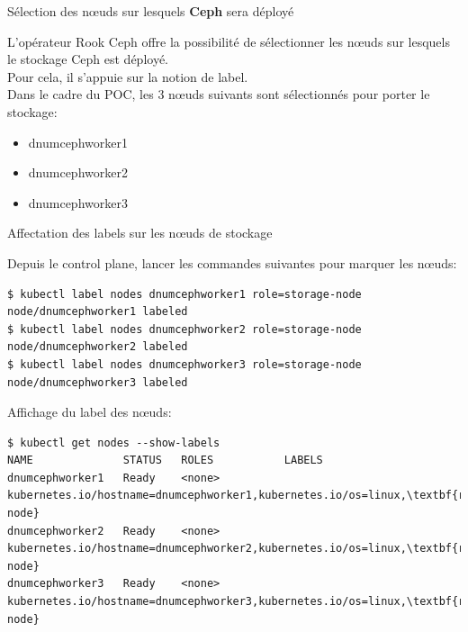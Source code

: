 
\begin{frame}[fragile]{Sélection des n\oe{}uds sur lesquels \textbf{Ceph} sera déployé}

   L'opérateur Rook Ceph offre la possibilité de sélectionner les n\oe{}uds sur lesquels le stockage Ceph est déployé.\\
   Pour cela, il s'appuie sur la notion de label.\\
   Dans le cadre du POC, les 3 n\oe{}uds suivants sont sélectionnés pour porter le stockage:
\begin{itemize}
   \item dnumcephworker1
   \item dnumcephworker2
   \item dnumcephworker3
\end{itemize}

\end{frame}


\begin{frame}[shrink=7,fragile]{Affectation des labels sur les n\oe{}uds de stockage}

   Depuis le control plane, lancer les commandes suivantes pour marquer les n\oe{}uds:
\begin{tiny}
\begin{Verbatim}[commandchars=\\\{\}]
$ kubectl label nodes dnumcephworker1 role=storage-node
node/dnumcephworker1 labeled
$ kubectl label nodes dnumcephworker2 role=storage-node
node/dnumcephworker2 labeled
$ kubectl label nodes dnumcephworker3 role=storage-node
node/dnumcephworker3 labeled
\end{Verbatim}
\end{tiny}

   Affichage du label des n\oe{}uds:
\begin{tiny}
\begin{Verbatim}[commandchars=\\\{\}]
$ kubectl get nodes --show-labels
NAME              STATUS   ROLES           LABELS
dnumcephworker1   Ready    <none>          kubernetes.io/hostname=dnumcephworker1,kubernetes.io/os=linux,\textbf{role=storage-node}
dnumcephworker2   Ready    <none>          kubernetes.io/hostname=dnumcephworker2,kubernetes.io/os=linux,\textbf{role=storage-node}
dnumcephworker3   Ready    <none>          kubernetes.io/hostname=dnumcephworker3,kubernetes.io/os=linux,\textbf{role=storage-node}
\end{Verbatim}
\end{tiny}
\end{frame}

